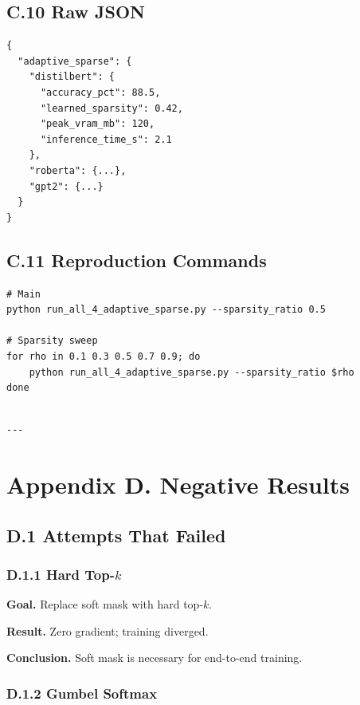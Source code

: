 \subsection{C.10 Raw JSON}

\begin{lstlisting}
{
  "adaptive_sparse": {
    "distilbert": {
      "accuracy_pct": 88.5,
      "learned_sparsity": 0.42,
      "peak_vram_mb": 120,
      "inference_time_s": 2.1
    },
    "roberta": {...},
    "gpt2": {...}
  }
}
\end{lstlisting}

\subsection{C.11 Reproduction Commands}

\begin{lstlisting}
# Main
python run_all_4_adaptive_sparse.py --sparsity_ratio 0.5

# Sparsity sweep
for rho in 0.1 0.3 0.5 0.7 0.9; do
    python run_all_4_adaptive_sparse.py --sparsity_ratio $rho
done
\end{lstlisting}
\begin{lstlisting}

---
\end{lstlisting}


\section{Appendix D. Negative Results}

\subsection{D.1 Attempts That Failed}

\subsubsection{D.1.1 Hard Top-$k$}

\textbf{Goal.} Replace soft mask with hard top-$k$.

\textbf{Result.} Zero gradient; training diverged.

\textbf{Conclusion.} Soft mask is necessary for end-to-end training.

\subsubsection{D.1.2 Gumbel Softmax}

